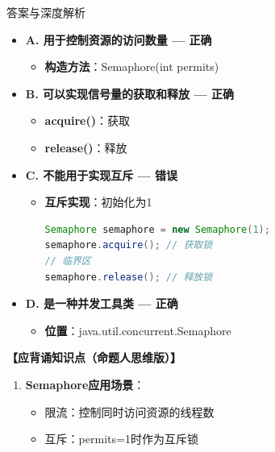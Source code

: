 \documentclass[12pt, a4paper]{ctexart}
\begin{document}
\begin{enumerate}[label=\textbf{\arabic*.}]
\begin{bluebox}{答案与深度解析}
\begin{itemize}[label={}, leftmargin=*, nosep]
		      \item \textbf{A. 用于控制资源的访问数量 — 正确}
		      \begin{itemize}[label={}, leftmargin=*, nosep]
			      \item \textbf{构造方法}：Semaphore(int permits)
		      \end{itemize}

		      \item \textbf{B. 可以实现信号量的获取和释放 — 正确}
		      \begin{itemize}[label={}, leftmargin=*, nosep]
			      \item \textbf{acquire()}：获取
			      \item \textbf{release()}：释放
		      \end{itemize}

		      \item \textbf{C. 不能用于实现互斥 — 错误}
		      \begin{itemize}[label={}, leftmargin=*, nosep]
			      \item \textbf{互斥实现}：初始化为1
			            \begin{lstlisting}[language=Java]
Semaphore semaphore = new Semaphore(1);
semaphore.acquire(); // 获取锁
// 临界区
semaphore.release(); // 释放锁
      \end{lstlisting}
		      \end{itemize}

		      \item \textbf{D. 是一种并发工具类 — 正确}
		      \begin{itemize}[label={}, leftmargin=*, nosep]
			      \item \textbf{位置}：java.util.concurrent.Semaphore
		      \end{itemize}

		      \end{itemize}

		      \textbf{【应背诵知识点（命题人思维版）】}
		      \begin{enumerate}[label={}, leftmargin=*, nosep]
			      \item \textbf{Semaphore应用场景}：
			            \begin{itemize}[label={}, nosep]
				            \item 限流：控制同时访问资源的线程数
				            \item 互斥：permits=1时作为互斥锁
			            \end{itemize}
		      \end{enumerate}


\end{bluebox}
\end{enumerate}
\end{document}
